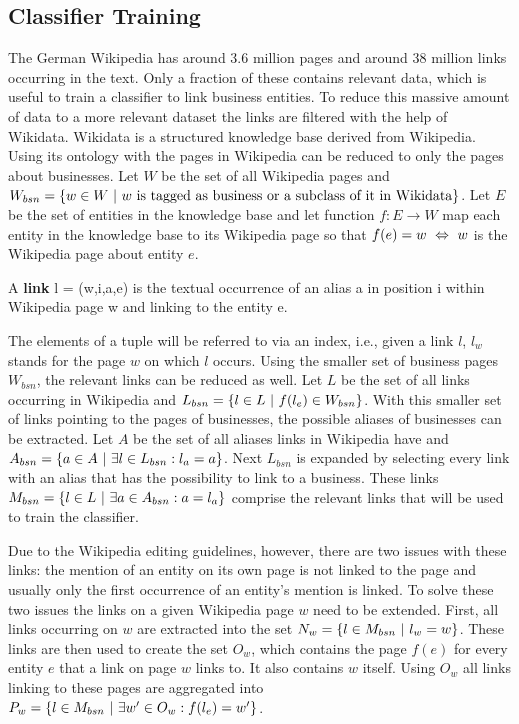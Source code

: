 \subsection{Classifier Training}
The German Wikipedia has around 3.6 million pages and around 38 million links occurring in the text. Only a fraction of these contains relevant data, which is useful to train a classifier to link business entities. To reduce this massive amount of data to a more relevant dataset the links are filtered with the help of Wikidata. Wikidata is a structured knowledge base derived from Wikipedia. Using its ontology with the pages in Wikipedia can be reduced to only the pages about businesses. Let $W$ be the set of all Wikipedia pages and $W_{bsn} = \{ w \in W {\mbox{ }|\mbox{ }} w \text{ is tagged as business or a subclass of it in Wikidata} \}$. Let $E$ be the set of entities in the knowledge base and let function $f: E \to W$ map each entity in the knowledge base to its Wikipedia page so that $f(e) = w {\mbox{ }\Leftrightarrow\mbox{ }} w$ is the Wikipedia page about entity $e$.
\begin{definition}
A \textbf{link} l = (w,i,a,e) is the textual occurrence of an alias a in position i within Wikipedia page w and linking to the entity e.
\label{link}
\end{definition}
The elements of a tuple will be referred to via an index, i.e., given a link $l$, $l_w$ stands for the page $w$ on which $l$ occurs. Using the smaller set of business pages $W_{bsn}$, the relevant links can be reduced as well. Let $L$ be the set of all links occurring in Wikipedia and $L_{bsn} = \{ l \in L {\mbox{ }|\mbox{ }} f(l_e) \in W_{bsn} \}$. With this smaller set of links pointing to the pages of businesses, the possible aliases of businesses can be extracted. Let $A$ be the set of all aliases links in Wikipedia have and $A_{bsn} = \{ a \in A {\mbox{ }|\mbox{ }} \exists l \in L_{bsn}: l_a = a \}$. Next $L_{bsn}$ is expanded by selecting every link with an alias that has the possibility to link to a business. These links $M_{bsn} = \{ l \in L {\mbox{ }|\mbox{ }} \exists a \in A_{bsn}: a = l_a \}$ comprise the relevant links that will be used to train the classifier.\par
Due to the Wikipedia editing guidelines, however, there are two issues with these links: the mention of an entity on its own page is not linked to the page and usually only the first occurrence of an entity's mention is linked. To solve these two issues the links on a given Wikipedia page $w$ need to be extended. First, all links occurring on $w$ are extracted into the set $N_w = \{ l \in M_{bsn} {\mbox{ }|\mbox{ }} l_w = w\}$. These links are then used to create the set $O_w$, which contains the page $f(e)$ for every entity $e$ that a link on page $w$ links to. It also contains $w$ itself. Using $O_w$ all links linking to these pages are aggregated into $P_w = \{ l \in M_{bsn} {\mbox{ }|\mbox{ }} \exists w' \in O_w: f(l_e) = w' \}$.\par
